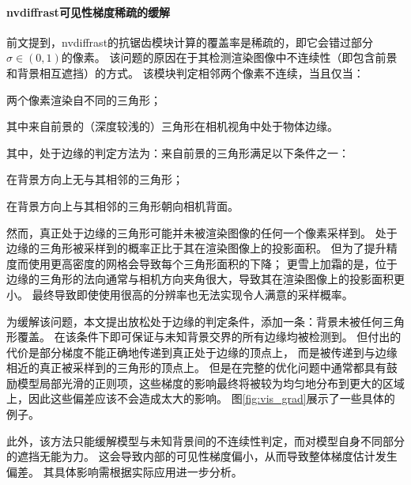 \paragraph{nvdiffrast可见性梯度稀疏的缓解}
前文提到，nvdiffrast的抗锯齿模块计算的覆盖率是稀疏的，即它会错过部分$\sigma\in(0,1)$的像素。
该问题的原因在于其检测渲染图像中不连续性（即包含前景和背景相互遮挡）的方式。
该模块判定相邻两个像素不连续，当且仅当：
\begin{enumerate*}
\item 两个像素渲染自不同的三角形；
\item 其中来自前景的（深度较浅的）三角形在相机视角中处于物体边缘。
\end{enumerate*}
其中，处于边缘的判定方法为：来自前景的三角形满足以下条件之一：
\begin{enumerate*}
\item 在背景方向上无与其相邻的三角形；
\item 在背景方向上与其相邻的三角形朝向相机背面。
\end{enumerate*}
然而，真正处于边缘的三角形可能并未被渲染图像的任何一个像素采样到。
处于边缘的三角形被采样到的概率正比于其在渲染图像上的投影面积。
但为了提升精度而使用更高密度的网格会导致每个三角形面积的下降；
更雪上加霜的是，位于边缘的三角形的法向通常与相机方向夹角很大，导致其在渲染图像上的投影面积更小。
最终导致即使使用很高的分辨率也无法实现令人满意的采样概率。

为缓解该问题，本文提出放松处于边缘的判定条件，添加一条：背景未被任何三角形覆盖。
在该条件下即可保证与未知背景交界的所有边缘均被检测到。
但付出的代价是部分梯度不能正确地传递到真正处于边缘的顶点上，
而是被传递到与边缘相近的真正被采样到的三角形的顶点上。
但是在完整的优化问题中通常都具有鼓励模型局部光滑的正则项，这些梯度的影响最终将被较为均匀地分布到更大的区域上，因此这些偏差应该不会造成太大的影响。
图\ref{fig:vis_grad}展示了一些具体的例子。

此外，该方法只能缓解模型与未知背景间的不连续性判定，而对模型自身不同部分的遮挡无能为力。
这会导致内部的可见性梯度偏小，从而导致整体梯度估计发生偏差。
其具体影响需根据实际应用进一步分析。

